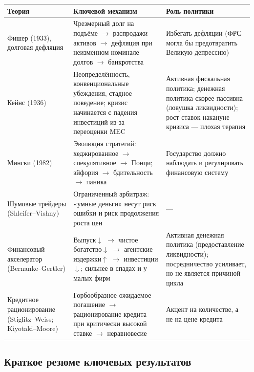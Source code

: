 \documentclass[10pt,a4paper]{article}
\begin{document}
\begin{center}
\small
\begin{tabular}{p{2.7cm}p{5.3cm}p{5.6cm}}
\toprule
\textbf{Теория} & \textbf{Ключевой механизм} & \textbf{Роль политики}\\
\midrule
Фишер (1933), долговая дефляция & Чрезмерный долг на подъёме $\to$ распродажи активов $\to$ дефляция при неизменном номинале долгов $\to$ банкротства & Избегать дефляции (ФРС могла бы предотвратить Великую депрессию)\\
\addlinespace
Кейнс (1936) & Неопределённость, конвенциональные убеждения, стадное поведение; кризис начинается с падения инвестиций из-за переоценки MEC & Активная фискальная политика; денежная политика скорее пассивна (ловушка ликвидности); рост ставок накануне кризиса — плохая терапия\\
\addlinespace
Мински (1982) & Эволюция стратегий: хеджированное $\to$ спекулятивное $\to$ Понци; эйфория $\to$ бдительность $\to$ паника & Государство должно наблюдать и регулировать финансовую систему\\
\addlinespace
Шумовые трейдеры (Shleifer--Vishny) & Ограниченный арбитраж: «умные деньги» несут риск ошибки и риск продолжения роста цен & ---\\
\addlinespace
Финансовый акселератор (Bernanke--Gertler) & Выпуск$\downarrow$ $\to$ чистое богатство$\downarrow$ $\to$ агентские издержки$\uparrow$ $\to$ инвестиции$\downarrow$; сильнее в спадах и у малых фирм & Активная денежная политика (предоставление ликвидности); посредничество усиливает, но не является причиной цикла\\
\addlinespace
Кредитное рационирование (Stiglitz--Weiss; Kiyotaki--Moore) & Горбообразное ожидаемое погашение $\to$ рационирование кредита при критически высокой ставке $\to$ неравновесие & Акцент на количестве, а не на цене кредита\\
\bottomrule
\end{tabular}
\end{center}

\subsection{Краткое резюме ключевых результатов}
\end{document}
